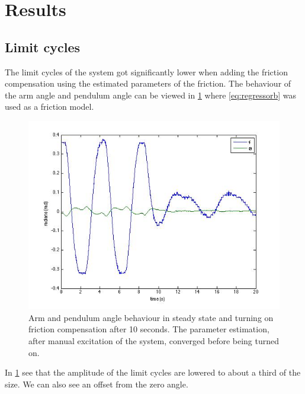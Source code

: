 \documentclass[10pt,a4paper]{article}
\begin{document}
\section{Results}


\subsection{Limit cycles}
The limit cycles of the system got significantly lower when adding the friction compensation using the estimated parameters of the friction. The behaviour of the arm angle and pendulum angle can be viewed in \ref{fig:onoffcompensation} where \ref{eq:regressorb} was used as a friction model.
\begin{figure}[H]
\begin{center}
\includegraphics[scale=0.6]{plots/onoffcompensation.jpg}
\caption{Arm and pendulum angle behaviour in steady state and turning on friction compensation after 10 seconds. The parameter estimation, after manual excitation of the system, converged before being turned on.}
\label{fig:onoffcompensation}
\end{center}
\end{figure}
In \ref{fig:onoffcompensation} see that the amplitude of the limit cycles are lowered to about a third of the size. We can also see an offset from the zero angle.
\end{document}
